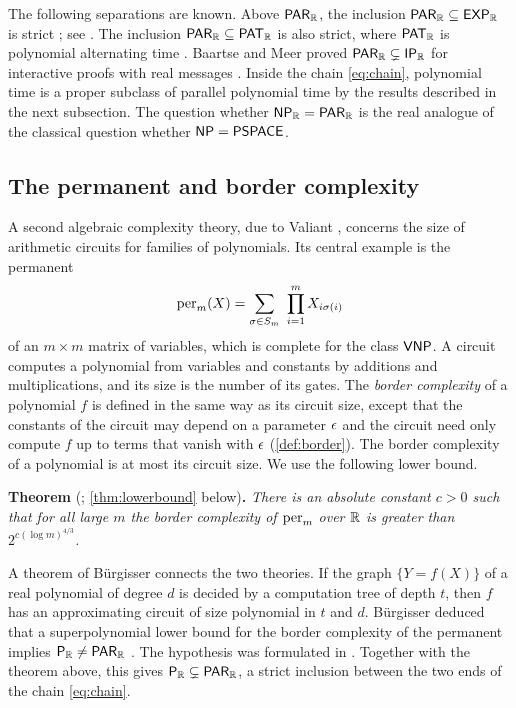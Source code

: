 The following separations are known. Above $\textsf{\upshape PAR}_{\mathbb{R}}$, the inclusion $\textsf{\upshape PAR}_{\mathbb{R}}\subseteq\textsf{\upshape EXP}_{\mathbb{R}}$ is strict \cite{Cuc92}; see \cite[Proposition~4.13]{MM97}. The inclusion $\textsf{\upshape PAR}_{\mathbb{R}}\subseteq\textsf{\upshape PAT}_{\mathbb{R}}$ is also strict, where $\textsf{\upshape PAT}_{\mathbb{R}}$ is polynomial alternating time \cite{Cuc93,BCSS98}. Baartse and Meer proved $\textsf{\upshape PAR}_{\mathbb{R}}\subsetneq\textsf{\upshape IP}_{\mathbb{R}}$ for interactive proofs with real messages \cite{BM16}. Inside the chain \eqref{eq:chain}, polynomial time is a proper subclass of parallel polynomial time by the results described in the next subsection. The question whether $\textsf{\upshape NP}_{\mathbb{R}}=\textsf{\upshape PAR}_{\mathbb{R}}$ is the real analogue of the classical question whether $\textsf{\upshape NP}=\textsf{\upshape PSPACE}$.

\subsection{The permanent and border complexity}

A second algebraic complexity theory, due to Valiant \cite{Val79}, concerns the size of arithmetic circuits for families of polynomials. Its central example is the permanent
\[
\operatorname{per}_m(X)=\sum_{\sigma\in S_m}\ \prod_{i=1}^mX_{i\sigma(i)}
\]
of an $m\times m$ matrix of variables, which is complete for the class $\textsf{\upshape VNP}$. A circuit computes a polynomial from variables and constants by additions and multiplications, and its size is the number of its gates. The \emph{border complexity} of a polynomial $f$ is defined in the same way as its circuit size, except that the constants of the circuit may depend on a parameter $\epsilon$ and the circuit need only compute $f$ up to terms that vanish with $\epsilon$ (\cref{def:border}). The border complexity of a polynomial is at most its circuit size. We use the following lower bound.

\medskip
\noindent\textbf{Theorem} (\cite{Cla26}; \cref{thm:lowerbound} below)\textbf{.} \emph{There is an absolute constant $c>0$ such that for all large $m$ the border complexity of $\operatorname{per}_m$ over $\mathbb{R}$ is greater than $2^{c(\log m)^{4/3}}$.}
\medskip

A theorem of B\"urgisser \cite{Bur04} connects the two theories. If the graph $\{Y=f(X)\}$ of a real polynomial of degree $d$ is decided by a computation tree of depth $t$, then $f$ has an approximating circuit of size polynomial in $t$ and $d$. B\"urgisser deduced that a superpolynomial lower bound for the border complexity of the permanent implies $\textsf{\upshape P}_{\mathbb{R}}\ne\textsf{\upshape PAR}_{\mathbb{R}}$ \cite[Corollary~4.5]{Bur04}. The hypothesis was formulated in \cite{Bur01}. Together with the theorem above, this gives $\textsf{\upshape P}_{\mathbb{R}}\subsetneq\textsf{\upshape PAR}_{\mathbb{R}}$, a strict inclusion between the two ends of the chain \eqref{eq:chain}.

